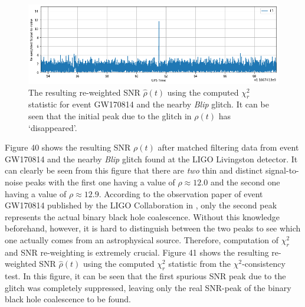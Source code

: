 \documentclass[preprint,
letterpaper,
 amsmath,amssymb,
 aps,
]{revtex4-2}
\begin{document}
\begin{figure}[t]
\includegraphics[width = .9\textwidth]{blip reweighted.png}
\caption{The resulting re-weighted SNR $\hat{\rho}(t)$ using the computed $\chi^2_r$ statistic for event GW170814 and the nearby \textit{Blip} glitch. It can be seen that the initial peak due to the glitch in $\rho(t)$ has `disappeared'.}
\centering
\end{figure}

Figure 40 shows the resulting SNR $\rho(t)$ after matched filtering data from event GW170814 and the nearby \textit{Blip} glitch found at the LIGO Livingston detector. It can clearly be seen from this figure that there are \textit{two} thin and distinct signal-to-noise peaks with the first one having a value of $\rho\approx 12.0$ and the second one having a value of $\rho\approx 12.9$. According to the observation paper of event GW170814 published by the LIGO Collaboration in \cite{blip}, only the second peak represents the actual binary black hole coalescence. Without this knowledge beforehand, however, it is hard to distinguish between the two peaks to see which one actually comes from an astrophysical source. Therefore, computation of $\chi_r^2$ and SNR re-weighting is extremely crucial. Figure 41 shows the resulting re-weighted SNR $\hat{\rho}(t)$ using the computed $\chi_r^2$ statistic from the $\chi^2$-consistency test. In this figure, it can be seen that the first spurious SNR peak due to the glitch was completely suppressed, leaving only the real SNR-peak of the binary black hole coalescence to be found. 
\end{document}
